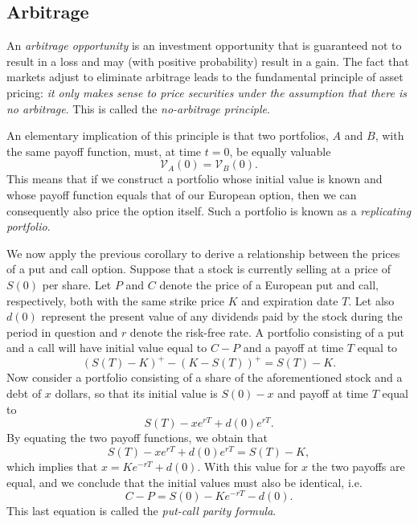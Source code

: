 \documentclass[]{article}
\theoremstyle{definition}
\theoremstyle{remark}
\begin{document}
\subsection{Arbitrage}
\par
An \textit{arbitrage opportunity} is an investment opportunity that is guaranteed not to result in a loss and may (with positive probability) result in a gain. The fact that markets adjust to eliminate arbitrage leads to the fundamental principle of asset pricing: \textit{it only makes sense to price securities under the assumption that there is no arbitrage}. This is called the \textit{no-arbitrage principle}.
\par 
An elementary implication of this principle is that two portfolios, $A$ and $B$, with the same payoff function, must, at time $t=0$, be equally valuable
\[\mathcal{V}_{A}(0) = \mathcal{V}_B (0). \]
This means that if we construct a portfolio whose initial value is known and whose payoff function equals that of our European option, then we can consequently also price the option itself. Such a portfolio is known as a \textit{replicating portfolio}.
\par We now apply the previous corollary to derive a relationship between the prices of a put and call option. Suppose that a stock is currently selling at a price of $S(0)$ per share. Let $P$ and $C$ denote the price of a European put and call, respectively, both with the same strike price $K$ and expiration date $T$. Let also $d(0)$ represent the present value of any dividends paid by the stock during the period in question and $r$ denote the risk-free rate. A portfolio consisting of a put and a call will have initial value equal to $C-P$ and a payoff at time $T$ equal to
\[(S(T) - K)^+ -(K-S(T))^+ = S(T)-K.\]
Now consider a portfolio consisting of a share of the aforementioned stock and a debt of $x$ dollars, so that its initial value is $S(0)-x$ and payoff at time $T$ equal to
\[  S(T) - x e^{rT} +d(0) e^{r T}. \]
By equating the two payoff functions, we obtain that
\[
S(T) - x e^{rT} +d(0) e^{r T} = S(T) - K,
\]
which implies that $x=K e^{-rT} + d(0)$. With this value for $x$ the two payoffs are equal, and we conclude that the initial values must also be identical, i.e.
\[ C-P = S(0) - Ke^{-rT} - d(0). \]
This last equation is called the \textit{put-call parity formula}.


\newpage
\nocite{*}

 
\end{document}
